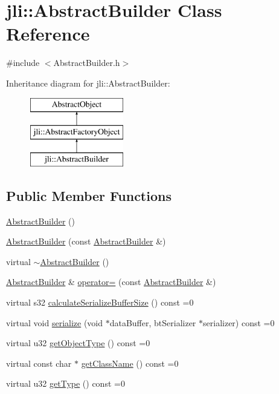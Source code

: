 \hypertarget{classjli_1_1_abstract_builder}{\section{jli\+:\+:Abstract\+Builder Class Reference}
\label{classjli_1_1_abstract_builder}
}


{\ttfamily \#include $<$Abstract\+Builder.\+h$>$}

Inheritance diagram for jli\+:\+:Abstract\+Builder\+:\begin{figure}[H]
\begin{center}
\leavevmode
\includegraphics[height=3.000000cm]{classjli_1_1_abstract_builder}
\end{center}
\end{figure}
\subsection*{Public Member Functions}
\begin{DoxyCompactItemize}
\item 
\hyperlink{classjli_1_1_abstract_builder_a25c37208a1124c8d16688ed9627b91ac}{Abstract\+Builder} ()
\item 
\hyperlink{classjli_1_1_abstract_builder_afa72506ca991fd169f99aca02cf0a56e}{Abstract\+Builder} (const \hyperlink{classjli_1_1_abstract_builder}{Abstract\+Builder} \&)
\item 
virtual \hyperlink{classjli_1_1_abstract_builder_ac685e3eedc598acfa1f8f879e8bd8767}{$\sim$\+Abstract\+Builder} ()
\item 
\hyperlink{classjli_1_1_abstract_builder}{Abstract\+Builder} \& \hyperlink{classjli_1_1_abstract_builder_af22cd8c52e03a1ce5adad70b6b9c06cf}{operator=} (const \hyperlink{classjli_1_1_abstract_builder}{Abstract\+Builder} \&)
\item 
virtual s32 \hyperlink{classjli_1_1_abstract_builder_a107ab66007cc293eb54c74e466c5d30a}{calculate\+Serialize\+Buffer\+Size} () const =0
\item 
virtual void \hyperlink{classjli_1_1_abstract_builder_a03c8719c6b852d1a21b1c7e0b7469fc0}{serialize} (void $\ast$data\+Buffer, bt\+Serializer $\ast$serializer) const =0
\item 
virtual u32 \hyperlink{classjli_1_1_abstract_builder_ab4bc84bbd7ff6f7b14b319a9dac4f67f}{get\+Object\+Type} () const =0
\item 
virtual const char $\ast$ \hyperlink{classjli_1_1_abstract_builder_ab482a893dd560709b3ee59f27b4035f4}{get\+Class\+Name} () const =0
\item 
virtual u32 \hyperlink{classjli_1_1_abstract_builder_a826f70c995257424b7d81ab2d4706ccf}{get\+Type} () const =0
\end{DoxyCompactItemize}
